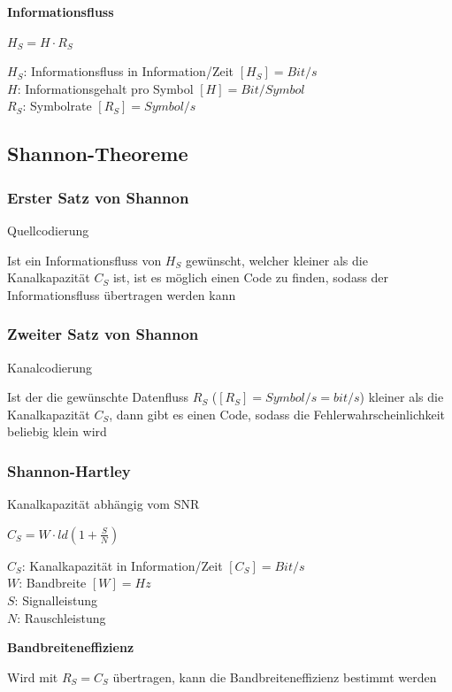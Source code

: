 \textbf{Informationsfluss}

$\displaystyle{
    H_S = H \cdot R_S
}$

$H_S$: Informationsfluss in Information/Zeit $[H_S] = Bit/s$\\
$H$: Informationsgehalt pro Symbol $[H] = Bit/Symbol$\\
$R_S$: Symbolrate $[R_S] = Symbol/s$

\subsection{Shannon-Theoreme}

\subsubsection{Erster Satz von Shannon}

Quellcodierung

Ist ein Informationsfluss von $H_S$ gewünscht, welcher kleiner als die Kanalkapazität $C_S$ ist,
ist es möglich einen Code zu finden, sodass der Informationsfluss übertragen werden kann

\subsubsection{Zweiter Satz von Shannon}

Kanalcodierung

Ist der die gewünschte Datenfluss $R_S$ ($[R_S] = Symbol/s = bit/s$) kleiner als die Kanalkapazität $C_S$, dann
gibt es einen Code, sodass die Fehlerwahrscheinlichkeit beliebig klein wird

\subsubsection{Shannon-Hartley}

Kanalkapazität abhängig vom SNR

$\displaystyle{
    C_S = W \cdot ld\left( 1 + \frac{S}{N} \right)
}$

$C_S$: Kanalkapazität in Information/Zeit $[C_S] = Bit/s$\\
$W$: Bandbreite $[W] = Hz$\\
$S$: Signalleistung\\
$N$: Rauschleistung

\textbf{Bandbreiteneffizienz}

Wird mit $R_S = C_S$ übertragen, kann die Bandbreiteneffizienz bestimmt werden

